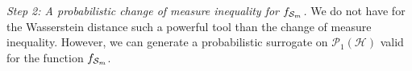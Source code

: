\textit{Step 2: A probabilistic change of measure inequality for $f_{\mathcal{S}_m}$.}
We do not have for the Wasserstein distance such a powerful tool than the change of measure inequality. However, we can generate a probabilistic surrogate on $\mathcal{P}_1(\mathcal{H})$ valid for the function $f_{\mathcal{S}_m}$.


